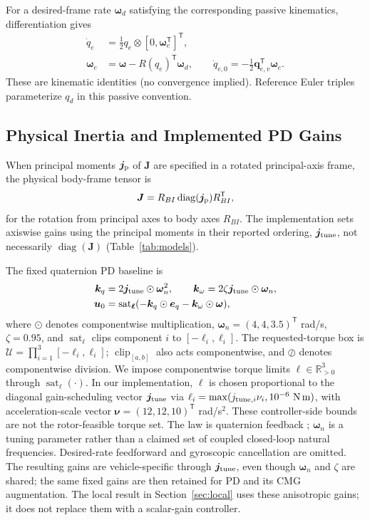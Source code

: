 \documentclass[letterpaper, 10 pt, conference]{ieeeconf}
\newcommand{\T}{^{\mathsf T}}
\newcommand{\sat}{\operatorname{sat}}
\newcommand{\clip}{\operatorname{clip}}
\begin{document}
For a desired-frame rate $\bm\omega_d$ satisfying the corresponding passive kinematics, differentiation gives
\begin{align}
 \dot q_e&=\tfrac12q_e\otimes[0,\bm\omega_e\T]\T,\\
 \bm\omega_e&=\bm\omega-R(q_e)\T\bm\omega_d,\qquad
 \dot q_{e,0}=-\tfrac12\bm q_{e,v}\T\bm\omega_e.
 \label{eq:errkin}
\end{align}
These are kinematic identities (no convergence implied). Reference Euler triples parameterize $q_d$ in this passive convention.

\subsection{Physical Inertia and Implemented PD Gains}
When principal moments $\bm j_{\rm p}$ of $\bm J$ are specified in a rotated principal-axis frame, the physical body-frame tensor is
\begin{equation}
 \bm J=R_{BI}\operatorname{diag}(\bm j_{\rm p})R_{BI}\T,
 \label{eq:inertiaframe}
\end{equation}
for the rotation from principal axes to body axes $R_{BI}$. The implementation sets axiswise gains using the principal moments in their reported ordering, $\bm j_{\rm tune}$, not necessarily $\operatorname{diag}(\bm J)$ (Table~\ref{tab:models}).

The fixed quaternion PD baseline is
\begin{align}
 \bm k_q&=2\bm j_{\rm tune}\odot\bm\omega_n^2,\qquad
 \bm k_\omega=2\zeta\bm j_{\rm tune}\odot\bm\omega_n,\\
 \bm u_0&=\sat_{\bm\ell}
       (-\bm k_q\odot\bm e_q-\bm k_\omega\odot\bm\omega),
 \label{eq:pd}
\end{align}
where $\odot$ denotes componentwise multiplication,
$\bm\omega_n=(4,4,3.5)\T$ rad/s, $\zeta=0.95$, and
$\sat_{\bm\ell}$ clips component $i$ to $[-\ell_i,\ell_i]$.
%
The requested-torque box is $\mathcal U=\prod_{i=1}^3[-\ell_i,\ell_i]$;
$\clip_{[a,b]}$ also acts componentwise, and $\oslash$ denotes componentwise division.
We impose componentwise torque limits $\bm\ell\in\mathbb R_{>0}^3$ through $\sat_{\bm\ell}(\cdot)$. In our implementation, $\bm\ell$ is chosen proportional to the diagonal gain-scheduling vector $\bm j_{\rm tune}$ via
$\ell_i=\max(j_{{\rm tune},i}\nu_i,10^{-6}\ \mathrm{N\,m})$,
with acceleration-scale vector $\bm\nu=(12,12,10)\T$ rad/s$^2$.
These controller-side bounds are not the rotor-feasible torque set.
%
The law is quaternion feedback \cite{fresk2013quaternion}; $\bm\omega_n$ is a tuning parameter rather than a claimed set of coupled closed-loop natural frequencies.
Desired-rate feedforward and gyroscopic cancellation are omitted.
The resulting gains are vehicle-specific through $\bm j_{\rm tune}$, even though
$\bm\omega_n$ and $\zeta$ are shared; the same fixed gains are then retained
for PD and its CMG augmentation.
The local result in Section~\ref{sec:local} uses these anisotropic gains; it does not replace them with a scalar-gain controller.
%
\end{document}
